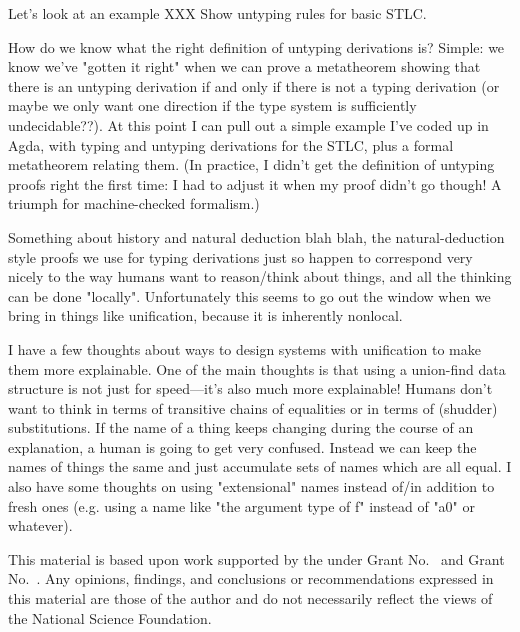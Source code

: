 \documentclass[sigplan, screen]{acmart}\settopmatter{printccs=false,printacmref=false}
\begin{document}
Let's look at an example XXX Show untyping rules for basic STLC.

How do we know what the right definition of untyping derivations is?  Simple: we know we've "gotten it right" when we can prove a metatheorem showing that there is an untyping derivation if and only if there is not a typing derivation (or maybe we only want one direction if the type system is sufficiently undecidable??).  At this point I can pull out a simple example I've coded up in Agda, with typing and untyping derivations for the STLC, plus a formal metatheorem relating them.  (In practice, I didn't get the definition of untyping proofs right the first time: I had to adjust it when my proof didn't go though!  A triumph for machine-checked formalism.)

Something about history and natural deduction blah blah, the natural-deduction style proofs we use for typing derivations just so happen to correspond very nicely to the way humans want to reason/think about things, and all the thinking can be done "locally".  Unfortunately this seems to go out the window when we bring in things like unification, because it is inherently nonlocal.

I have a few thoughts about ways to design systems with unification to make them more explainable.  One of the main thoughts is that using a union-find data structure is not just for speed---it's also much more explainable!  Humans don't want to think in terms of transitive chains of equalities or in terms of (shudder) substitutions.  If the name of a thing keeps changing during the course of an explanation, a human is going to get very confused.  Instead we can keep the names of things the same and just accumulate sets of names which are all equal.  I also have some thoughts on using "extensional" names instead of/in addition to fresh ones (e.g. using a name like "the argument type of f" instead of "a0" or whatever).



\begin{acks}                            %
  This material is based upon work supported by the
   under Grant
  No.~ and Grant
  No.~.  Any opinions, findings, and
  conclusions or recommendations expressed in this material are those
  of the author and do not necessarily reflect the views of the
  National Science Foundation.
\end{acks}


%
\end{document}
